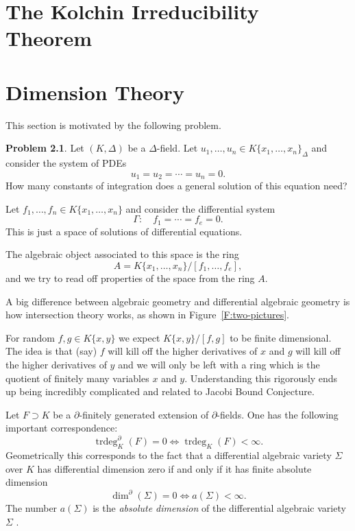 \documentclass[12pt]{book}
\numberwithin{equation}{section}
\theoremstyle{definition}
\newtheorem{problem}[theorem]{Problem}
\theoremstyle{remark}
\newcommand{\trdeg}{\operatorname{trdeg}}
\begin{document}
\chapter[Kolchin Irreducibility]{The Kolchin Irreducibility Theorem}\label{S:kolchin-irreducibility}


\chapter[Dimension Theory]{Dimension Theory}\label{S:dimension-theory}

This section is motivated by the following problem.
\begin{problem}
	Let $(K,\Delta)$ be a $\Delta$-field. 
	Let $u_1,\ldots,u_n \in K\lbrace x_1,\ldots,x_n\rbrace_{\Delta}$ and consider the system of PDEs
	 $$ u_1=u_2=\cdots=u_n=0. $$
	How many constants of integration does a general solution of this equation need?
\end{problem}

Let $f_1,\ldots,f_n \in K\lbrace x_1,\ldots,x_n\rbrace$ and consider the differential system 
$$ \Gamma \colon \quad f_1=\cdots = f_e =0.$$
This is just a space of solutions of differential equations. 

The algebraic object associated to this space is the ring 
$$ A=K\lbrace x_1,\ldots, x_n\rbrace/[f_1,\ldots,f_e],$$
and we try to read off properties of the space from the ring $A$.

A big difference between algebraic geometry and differential algebraic geometry is how intersection theory works, as shown in Figure~\ref{F:two-pictures}.

For random $f,g \in K\lbrace x,y \rbrace$ we expect $K\lbrace x,y\rbrace/[f,g]$ to be finite dimensional. 
The idea is that (say) $f$ will kill off the higher derivatives of $x$ and $g$ will kill off the higher derivatives of $y$ and we will only be left with a ring which is the quotient of finitely many variables $x$ and $y$.
Understanding this rigorously ends up being incredibly complicated and related to Jacobi Bound Conjecture.



Let $F\supset K$ be a $\partial$-finitely generated extension of $\partial$-fields.
One has the following important correspondence:
$$ \trdeg_K^{\partial}(F)=0 \iff \trdeg_K(F)<\infty. $$
Geometrically this corresponds to the fact that a differential algebraic variety $\Sigma$ over $K$ has differential dimension zero if and only if it has finite absolute dimension
$$\dim^{\partial}(\Sigma)=0 \iff a(\Sigma)<\infty.$$ 
The number $a(\Sigma)$ is the \emph{absolute dimension} of the differential algebraic variety $\Sigma$ \cite[\S 2, pg 485]{Buium1993}. 
\end{document}
